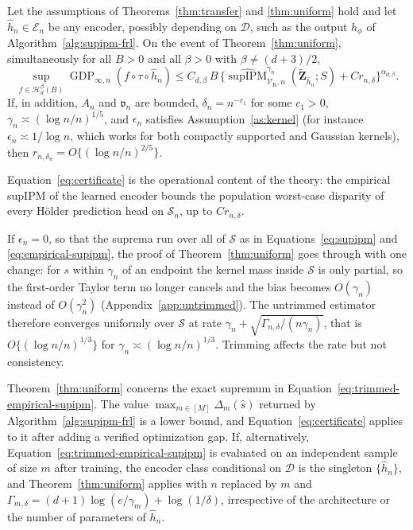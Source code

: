\begin{corollary}
\label{cor:certificate}
Let the assumptions of Theorems~\ref{thm:transfer} and \ref{thm:uniform} hold and let $\widehat{h}_n\in\mathcal{E}_n$ be any encoder, possibly depending on $\mathcal{D}$, such as the output $h_{\phi}$ of Algorithm~\ref{alg:supipm-frl}.  On the event of Theorem~\ref{thm:uniform}, simultaneously for all $B>0$ and all $\beta>0$ with $\beta\ne(d+3)/2$,
\begin{equation}
  \sup_{f\in\mathcal{H}^{\beta}_d(B)}
  \operatorname{GDP}_{\infty,n}(f\circ\tau\circ\widehat{h}_n)
  \le C_{d,\beta}\,B\,
  \Big\{
    \widehat{\operatorname{supIPM}}^{\gamma_n}_{\mathcal{V}_{\mathrm{R}},n}
    (\widetilde{\mathbf{Z}}_{\widehat{h}_n};S)
    +Cr_{n,\delta}
  \Big\}^{\alpha_{d,\beta}} .
  \label{eq:certificate}
\end{equation}
If, in addition, $A_n$ and $\mathfrak{v}_n$ are bounded, $\delta_n=n^{-c_1}$ for some $c_1>0$, $\gamma_n\asymp(\log n/n)^{1/5}$, and $\epsilon_n$ satisfies Assumption~\ref{as:kernel} (for instance $\epsilon_n\asymp1/\log n$, which works for both compactly supported and Gaussian kernels), then $r_{n,\delta_n}=O\{(\log n/n)^{2/5}\}$.
\end{corollary}

Equation~\ref{eq:certificate} is the operational content of the theory: the empirical supIPM of the learned encoder bounds the population worst-case disparity of every H\"older prediction head on $\mathcal{S}_n$, up to $Cr_{n,\delta}$.

\begin{remark}
\label{rem:untrimmed}
If $\epsilon_n=0$, so that the suprema run over all of $\mathcal{S}$ as in Equations~\ref{eq:supipm} and \ref{eq:empirical-supipm}, the proof of Theorem~\ref{thm:uniform} goes through with one change: for $s$ within $\gamma_n$ of an endpoint the kernel mass inside $\mathcal{S}$ is only partial, so the first-order Taylor term no longer cancels and the bias becomes $O(\gamma_n)$ instead of $O(\gamma_n^2)$ (Appendix~\ref{app:untrimmed}).  The untrimmed estimator therefore converges uniformly over $\mathcal{S}$ at rate $\gamma_n+\sqrt{\Gamma_{n,\delta}/(n\gamma_n)}$, that is $O\{(\log n/n)^{1/3}\}$ for $\gamma_n\asymp(\log n/n)^{1/3}$.  Trimming affects the rate but not consistency.
\end{remark}

\begin{remark}
\label{rem:practical}
Theorem~\ref{thm:uniform} concerns the exact supremum in Equation~\ref{eq:trimmed-empirical-supipm}.  The value $\max_{m\in[M]}\Delta_m(\hat{s})$ returned by Algorithm~\ref{alg:supipm-frl} is a lower bound, and Equation~\ref{eq:certificate} applies to it after adding a verified optimization gap.  If, alternatively, Equation~\ref{eq:trimmed-empirical-supipm} is evaluated on an independent sample of size $m$ after training, the encoder class conditional on $\mathcal{D}$ is the singleton $\{\widehat{h}_n\}$, and Theorem~\ref{thm:uniform} applies with $n$ replaced by $m$ and $\Gamma_{m,\delta}=(d+1)\log(e/\gamma_m)+\log(1/\delta)$, irrespective of the architecture or the number of parameters of $\widehat{h}_n$.
\end{remark}
